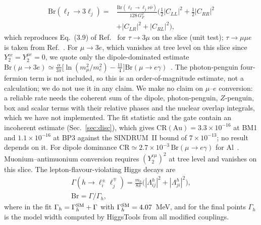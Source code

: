 \documentclass[twocolumn,epjc3]{svjour3}
\newcommand{\HG}{Ref.~\cite{HerreroGarcia:2017xdq}}
\newcommand{\Br}{\mathrm{Br}}
\begin{document}
\begin{equation}
\begin{split}\Br(\ell_I\to3\ell_j)={}&\frac{\Br(\ell_I\to\ell_j\nu\bar\nu)}{128\,G_F^2}\Big(\tfrac12|C_{LL}|^2+\tfrac12|C_{RR}|^2\\&+|C_{LR}|^2+|C_{RL}|^2\Big),\end{split}
\label{eq:l3}
\end{equation}
which reproduces Eq.~(3.9) of \HG{} for $\tau\to3\mu$ on the slice (unit test); $\tau\to\mu\mu e$ is taken from \HG{}. For $\mu\to3e$, which vanishes at tree level on this slice since $Y_2^{ee}=Y_2^{\mu e}=0$, we quote only the dipole-dominated estimate $\Br(\mu\to3e)\simeq\frac{\alpha}{3\pi}\big[\ln(m_\mu^2/m_e^2)-\tfrac{11}{4}\big]\Br(\mu\to e\gamma)$~\cite{Kuno:1999jp}. The photon-penguin four-fermion term is not included, so this is an order-of-magnitude estimate, not a calculation; we do not use it in any claim. We make no claim on $\mu$--$e$ conversion: a reliable rate needs the coherent sum of the dipole, photon-penguin, $Z$-penguin, box and scalar terms with their relative phases and the nuclear overlap integrals, which we have not implemented. The fit statistic and the gate contain an incoherent estimate (Sec.~\ref{sec:disc}), which gives $\mathrm{CR}(\mathrm{Au})=3.3\times10^{-16}$ at BM1 and $1.1\times10^{-16}$ at BP3 against the SINDRUM~II bound of $7\times10^{-13}$; no result depends on it. For dipole dominance $\mathrm{CR}\simeq2.7\times10^{-3}\,\Br(\mu\to e\gamma)$ for Al~\cite{Kitano:2002mt}. Muonium--antimuonium conversion requires $(Y_2^{e\mu})^2$ at tree level and vanishes on this slice. The lepton-flavour-violating Higgs decays are
\begin{equation}
\begin{gathered}\Gamma(h\to\ell_i^\pm\ell_j^\mp)=\frac{m_h}{8\pi}\big(|\Lambda^h_{ij}|^2+|\Lambda^h_{ji}|^2\big),\\ \Br=\Gamma/\Gamma_h,\end{gathered}
\end{equation}
where in the fit $\Gamma_h=\Gamma_h^{\rm SM}+\Gamma$ with $\Gamma_h^{\rm SM}=4.07$~MeV, and for the final points $\Gamma_h$ is the model width computed by HiggsTools from all modified couplings.
\end{document}
